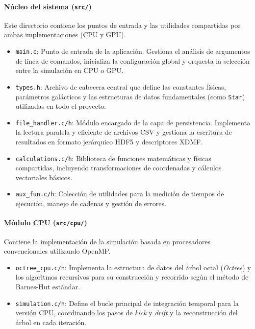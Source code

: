 \paragraph*{Núcleo del sistema (\texttt{src/})}
Este directorio contiene los puntos de entrada y las utilidades compartidas por ambas implementaciones (CPU y GPU).

\begin{itemize}
    \item \texttt{main.c}: Punto de entrada de la aplicación. Gestiona el análisis de argumentos de línea de comandos, inicializa la configuración global y orquesta la selección entre la simulación en CPU o GPU.
    \item \texttt{types.h}: Archivo de cabecera central que define las constantes físicas, parámetros galácticos y las estructuras de datos fundamentales (como \texttt{Star}) utilizadas en todo el proyecto.
    \item \texttt{file\_handler.c/h}: Módulo encargado de la capa de persistencia. Implementa la lectura paralela y eficiente de archivos CSV y gestiona la escritura de resultados en formato jerárquico HDF5 y descriptores XDMF.
    \item \texttt{calculations.c/h}: Biblioteca de funciones matemáticas y físicas compartidas, incluyendo transformaciones de coordenadas y cálculos vectoriales básicos.
    \item \texttt{aux\_fun.c/h}: Colección de utilidades para la medición de tiempos de ejecución, manejo de cadenas y gestión de errores.
\end{itemize}

\paragraph*{Módulo CPU (\texttt{src/cpu/})}
Contiene la implementación de la simulación basada en procesadores convencionales utilizando OpenMP.

\begin{itemize}
    \item \texttt{octree\_cpu.c/h}: Implementa la estructura de datos del árbol octal (\textit{Octree}) y los algoritmos recursivos para su construcción y recorrido según el método de Barnes-Hut estándar.
    \item \texttt{simulation.c/h}: Define el bucle principal de integración temporal para la versión CPU, coordinando los pasos de \textit{kick} y \textit{drift} y la reconstrucción del árbol en cada iteración.
\end{itemize}

